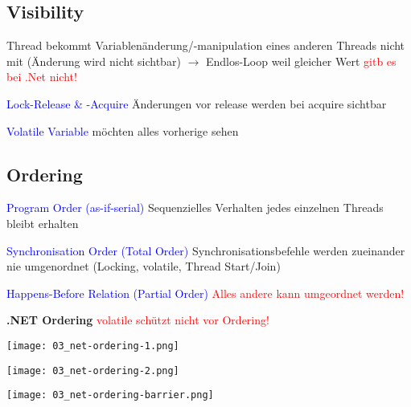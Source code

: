 %
%

\subsection{Visibility}

Thread bekommt Variablenänderung/-manipulation eines anderen Threads nicht mit (Änderung wird nicht sichtbar) $\rightarrow$ Endlos-Loop weil gleicher Wert \textcolor{red}{gitb es bei .Net nicht!}

\textcolor{blue}{Lock-Release \& -Acquire} Änderungen vor release werden bei acquire sichtbar

\textcolor{blue}{Volatile Variable} möchten alles vorherige sehen

\subsection{Ordering}

\textcolor{blue}{Program Order (as-if-serial)} Sequenzielles Verhalten jedes einzelnen Threads bleibt erhalten

\textcolor{blue}{Synchronisation Order (Total Order)} Synchronisationsbefehle werden zueinander nie umgenordnet (Locking, volatile, Thread Start/Join)

\textcolor{blue}{Happens-Before Relation (Partial Order)} \textcolor{red}{Alles andere kann umgeordnet werden!}

\textbf{.NET Ordering} \textcolor{red}{volatile schützt nicht vor Ordering!}

\begin{minipage}[t]{0.3\linewidth}
    \texttt{[image: 03\_net-ordering-1.png]}
\end{minipage}
\begin{minipage}[t]{0.3\linewidth}
    \texttt{[image: 03\_net-ordering-2.png]}
\end{minipage}
\begin{minipage}[t]{0.3\linewidth}
    \texttt{[image: 03\_net-ordering-barrier.png]}
\end{minipage}

